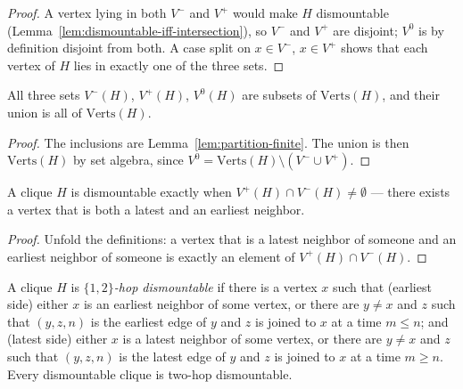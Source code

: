 \begin{proof}
  \leanok
  A vertex lying in both $V^-$ and $V^+$ would make $H$ dismountable (Lemma~\ref{lem:dismountable-iff-intersection}), so $V^-$ and $V^+$ are disjoint; $V^0$ is by definition disjoint from both. A case split on $x \in V^-$, $x \in V^+$ shows that each vertex of $H$ lies in exactly one of the three sets.
\end{proof}

\begin{lemma}
  \label{lem:vminus-vplus-vzero-decomp}
  \leanok
  All three sets $V^-(H)$, $V^+(H)$, $V^0(H)$ are subsets of
  $\mathrm{Verts}(H)$, and their union is all of $\mathrm{Verts}(H)$.
\end{lemma}

\begin{proof}
  \leanok
  The inclusions are Lemma~\ref{lem:partition-finite}. The union is then $\mathrm{Verts}(H)$ by set algebra, since $V^0 = \mathrm{Verts}(H) \setminus (V^- \cup V^+)$.
\end{proof}

\begin{lemma}
  \label{lem:dismountable-iff-intersection}
  \leanok
  A clique $H$ is dismountable exactly when $V^+(H) \cap V^-(H) \neq
  \emptyset$ — there exists a vertex that is both a latest and an earliest
  neighbor.
\end{lemma}

\begin{proof}
  \leanok
  Unfold the definitions: a vertex that is a latest neighbor of someone and an earliest neighbor of someone is exactly an element of $V^+(H) \cap V^-(H)$.
\end{proof}

\begin{definition}
  \label{def:two-hop-dismountable}
  \leanok
  A clique $H$ is \emph{$\{1,2\}$-hop dismountable} if there is a vertex $x$ such
  that (earliest side) either $x$ is an earliest neighbor of some vertex, or
  there are $y \neq x$ and $z$ such that $(y,z,n)$ is the earliest edge of $y$
  and $z$ is joined to $x$ at a time $m \le n$; and (latest side) either $x$ is
  a latest neighbor of some vertex, or there are $y \neq x$ and $z$ such that
  $(y,z,n)$ is the latest edge of $y$ and $z$ is joined to $x$ at a time
  $m \ge n$. Every dismountable clique is two-hop dismountable.
\end{definition}


